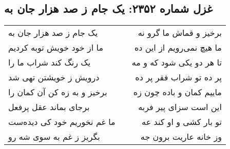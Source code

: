 \begin{center}
\section*{غزل شماره ۲۳۵۲: یک جام ز صد هزار جان به}
\label{sec:2352}
\begin{longtable}{l p{0.5cm} r}
یک جام ز صد هزار جان به
&&
برخیز و قماش ما گرو نه
\\
ما از خود خویش توبه کردیم
&&
ما هیچ نمی‌رویم از این ده
\\
یک رنگ کند شراب ما را
&&
تا هر دو یکی شود که و مه
\\
درویش ز خویشتن تهی شد
&&
پر ده تو شراب فقر پر ده
\\
برخیز و به زه کن آن کمان را
&&
ماییم کمان و باده چون زه
\\
برجای بماند عقل پرفعل
&&
این است سزای پیر فربه
\\
ما غم نخوریم خود کی دیده‌ست
&&
تو بار کشی و او کند عه
\\
بگریز ز غم به سوی شه رو
&&
وز خانه عاریت برون جه
\\
\end{longtable}
\end{center}
